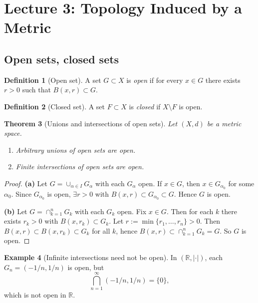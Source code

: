 \documentclass[11pt]{article}
\newtheorem{theorem}{Theorem}[section]
\theoremstyle{definition}
\newtheorem{definition}[theorem]{Definition}
\newtheorem{example}[theorem]{Example}
\newcommand{\R}{\mathbb{R}}
\begin{document}
\section{Lecture 3: Topology Induced by a Metric}

\subsection{Open sets, closed sets}

\begin{definition}[Open set]
A set $G\subset X$ is \emph{open} if for every $x\in G$ there exists $r>0$ such that $B(x,r)\subset G$.
\end{definition}

\begin{definition}[Closed set]
A set $F\subset X$ is \emph{closed} if $X\setminus F$ is open.
\end{definition}

\begin{theorem}[Unions and intersections of open sets]
Let $(X,d)$ be a metric space.
\begin{enumerate}[label=\textbf{(\alph*)}]
\item Arbitrary unions of open sets are open.
\item Finite intersections of open sets are open.
\end{enumerate}
\end{theorem}

\begin{proof}
\textbf{(a)} Let $G=\cup_{\alpha\in I} G_\alpha$ with each $G_\alpha$ open. If $x\in G$, then $x\in G_{\alpha_0}$ for some $\alpha_0$.
Since $G_{\alpha_0}$ is open, $\exists r>0$ with $B(x,r)\subset G_{\alpha_0}\subset G$. Hence $G$ is open.

\textbf{(b)} Let $G=\cap_{k=1}^n G_k$ with each $G_k$ open. Fix $x\in G$. Then for each $k$ there exists $r_k>0$ with $B(x,r_k)\subset G_k$.
Let $r:=\min\{r_1,\dots,r_n\}>0$. Then $B(x,r)\subset B(x,r_k)\subset G_k$ for all $k$, hence $B(x,r)\subset \cap_{k=1}^n G_k=G$.
So $G$ is open.
\end{proof}

\begin{example}[Infinite intersections need not be open]
In $(\R,|\cdot|)$, each $G_n=(-1/n,1/n)$ is open, but
\[
\bigcap_{n=1}^\infty (-1/n,1/n)=\{0\},
\]
which is not open in $\R$.
\end{example}
\end{document}
